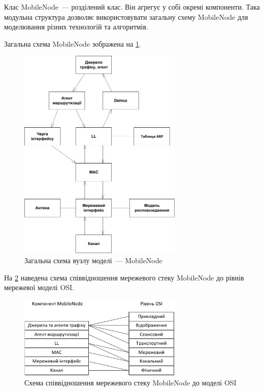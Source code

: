 \documentclass[a4paper,ukrainian,utf8,nocolumnsxix,nocolumnxxxii,nocolumnxxxi,floatsection,equationsection]{eskdtext}
\begin{document}
Клас MobileNode~--- розділений клас. Він агрегує у собі окремі компоненти. Така модульна структура дозволяє використовувати загальну схему MobileNode для моделювання різних технологій та алгоритмів. 

Загальна схема MobileNode зображена на \cref{fig:mobile_node}.

\begin{figure}[bth]
	\centering
	\includegraphics[width=0.7\textwidth]{img/mobile_node.pdf}
	\caption{\label{fig:mobile_node}Загальна схема вузлу моделі~--- MobileNode}
\end{figure}

На \cref{fig:mobile_node:osi:comparison} наведена схема співвідношення мережевого стеку MobileNode до рівнів мережевої моделі OSI.

\begin{figure}[bth]
	\centering
	\includegraphics[width=0.7\textwidth]{img/osi.pdf}
	\caption{\label{fig:mobile_node:osi:comparison}Схема співвідношення мережевого стеку MobileNode до моделі OSI}
\end{figure}
\end{document}
